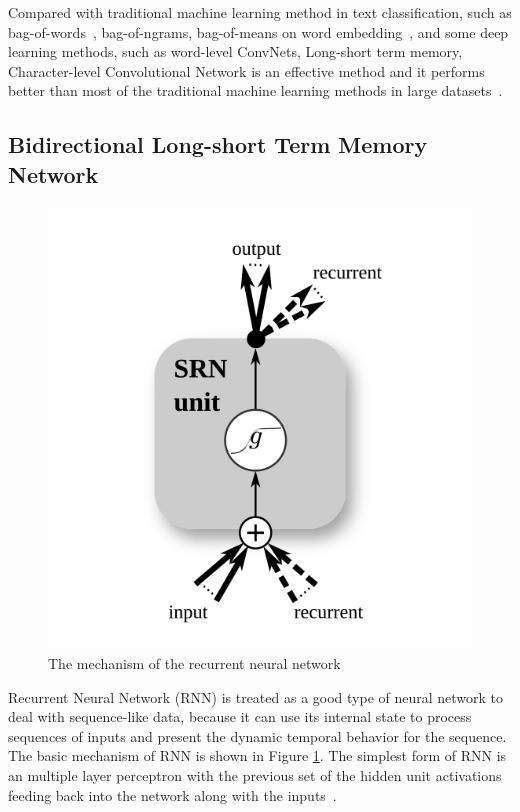 Compared with traditional machine learning method in text classification, such as bag-of-words~\cite{sparck1972statistical}, bag-of-ngrams, bag-of-means on word embedding~\cite{mikolov2013distributed}, and some deep learning methods, such as word-level ConvNets, Long-short term memory, Character-level Convolutional Network is an effective method and it performs better than most of the traditional machine learning methods in large datasets~\cite{zhang2015character}.

\subsection{Bidirectional Long-short Term Memory Network}
\label{background_lstm}
\begin{figure}
\centering
\caption{The mechanism of the recurrent neural network~\cite{Greff2017}}
\label{rnn}
\includegraphics{rnn.png}
\end{figure}
Recurrent Neural Network (RNN) is treated as a good type of neural network to deal with sequence-like data, because it can use its internal state to process sequences of inputs and present the dynamic temporal behavior for the sequence. The basic mechanism of RNN is shown in Figure \ref{rnn}. The simplest form of RNN is an multiple layer perceptron with the previous set of the hidden unit activations feeding back into the network along with the inputs~\cite{bullinaria2013recurrent}. 

